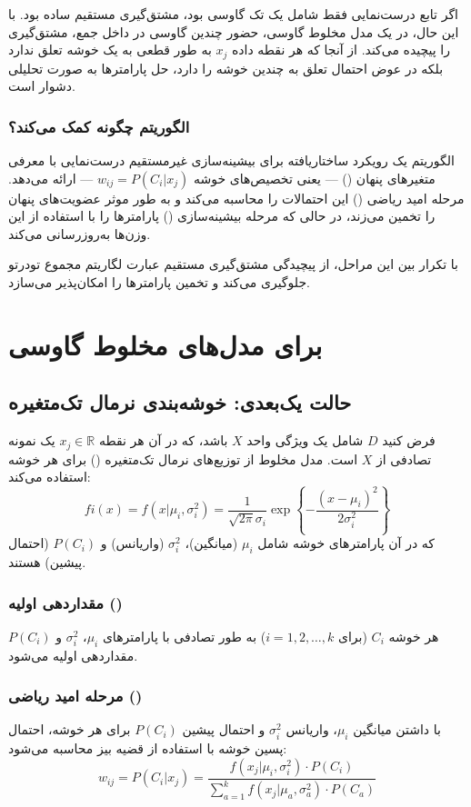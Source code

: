 \documentclass{article}
\begin{document}
اگر تابع درست‌نمایی فقط شامل یک تک گاوسی بود، مشتق‌گیری مستقیم ساده بود. با این حال، در یک مدل مخلوط گاوسی، حضور چندین گاوسی در داخل جمع، مشتق‌گیری را پیچیده می‌کند. از آنجا که هر نقطه داده $x_j$ به طور قطعی به یک خوشه تعلق ندارد بلکه در عوض احتمال تعلق به چندین خوشه را دارد، حل پارامترها به صورت تحلیلی دشوار است.

\subsubsection*{الگوریتم  چگونه کمک می‌کند؟}
الگوریتم  یک رویکرد ساختاریافته برای بیشینه‌سازی غیرمستقیم درست‌نمایی با معرفی متغیرهای پنهان () — یعنی تخصیص‌های خوشه $w_{ij} = P(C_i|x_j)$ — ارائه می‌دهد. مرحله امید ریاضی () این احتمالات را محاسبه می‌کند و به طور موثر عضویت‌های پنهان را تخمین می‌زند، در حالی که مرحله بیشینه‌سازی () پارامترها را با استفاده از این وزن‌ها به‌روزرسانی می‌کند.

با تکرار بین این مراحل،  از پیچیدگی مشتق‌گیری مستقیم عبارت لگاریتم مجموع تودرتو جلوگیری می‌کند و تخمین پارامترها را امکان‌پذیر می‌سازد.

\section*{ برای مدل‌های مخلوط گاوسی}

\subsection*{حالت یک‌بعدی: خوشه‌بندی نرمال تک‌متغیره}
فرض کنید $D$ شامل یک ویژگی واحد $X$ باشد، که در آن هر نقطه $x_j \in \mathbb{R}$ یک نمونه تصادفی از $X$ است.
مدل مخلوط از توزیع‌های نرمال تک‌متغیره () برای هر خوشه استفاده می‌کند:
\[
fi(x) = f(x|\mu_i, \sigma_i^2) = \frac{1}{\sqrt{2\pi}\sigma_i} \exp \left\{ -\frac{(x - \mu_i)^2}{2\sigma_i^2} \right\}
\]
که در آن پارامترهای خوشه شامل $\mu_i$ (میانگین)، $\sigma_i^2$ (واریانس) و $P(C_i)$ (احتمال پیشین) هستند.

\subsubsection*{مقداردهی اولیه ()}
هر خوشه $C_i$ (برای $i = 1, 2, \dots, k$) به طور تصادفی با پارامترهای $\mu_i$، $\sigma_i^2$ و $P(C_i)$ مقداردهی اولیه می‌شود.

\subsubsection*{مرحله امید ریاضی ()}
با داشتن میانگین $\mu_i$، واریانس $\sigma_i^2$ و احتمال پیشین $P(C_i)$ برای هر خوشه، احتمال پسین خوشه با استفاده از قضیه بیز محاسبه می‌شود:
\[
w_{ij} = P(C_i|x_j) = \frac{f(x_j|\mu_i, \sigma_i^2) \cdot P(C_i)}{\sum_{a=1}^{k} f(x_j|\mu_a, \sigma_a^2) \cdot P(C_a)}
\]
\end{document}
